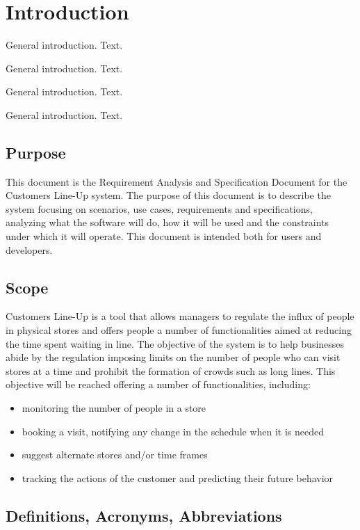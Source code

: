 \documentclass[a4paper]{article}
\begin{document}
\listoftodos

\tableofcontents

\section{Introduction}
General introduction. Text.

General introduction. Text.

General introduction. Text.

General introduction. Text.
\subsection{Purpose}
This document is the Requirement Analysis and Specification Document for the Customers Line-Up system.
The purpose of this document is to describe the system focusing on scenarios, use cases, requirements and specifications,
analyzing what the software will do, how it will be used and the constraints under which it will operate.
This document is intended both for users and developers.

\subsection{Scope}
Customers Line-Up is a tool that allows managers to regulate the influx of people in physical stores and offers
people a number of functionalities aimed at reducing the time spent waiting in line.
The objective of the system is to help businesses abide by the regulation imposing limits on the number of people
who can visit stores at a time and prohibit the formation of crowds such as long lines.
This objective will be reached offering a number of functionalities, including:
\begin{itemize}
    \item monitoring the number of people in a store
    \item booking a visit, notifying any change in the schedule when it is needed
    \item suggest alternate stores and/or time frames
    \item tracking the actions of the customer and predicting their future behavior
\end{itemize}

\subsection{Definitions, Acronyms, Abbreviations}
\end{document}
